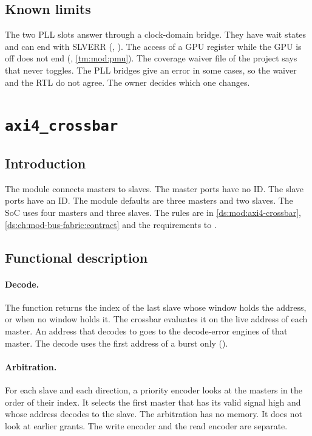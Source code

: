 \subsection{Known limits}
The two PLL slots answer through a clock-domain bridge. They have wait states and can end with SLVERR (, ). The access of a GPU register while the GPU is off does not end (, \cref{tm:mod:pmu}). The coverage waiver file of the project says that  never toggles. The PLL bridges give an error in some cases, so the waiver and the RTL do not agree. The owner decides which one changes.

\section{\texttt{axi4\_crossbar}}\label{tm:mod:axi4-crossbar}

\subsection{Introduction}
The module  connects  masters to  slaves. The master ports have no ID. The slave ports have an ID. The module defaults are three masters and two slaves. The SoC uses four masters and three slaves. The rules are in \cref{ds:mod:axi4-crossbar}, \cref{ds:ch:mod-bus-fabric:contract} and the requirements  to .

\subsection{Functional description}
\paragraph{Decode.} The function  returns the index of the last slave whose window holds the address, or  when no window holds it. The crossbar evaluates it on the live address of each master. An address that decodes to  goes to the decode-error engines of that master. The decode uses the first address of a burst only ().

\paragraph{Arbitration.} For each slave and each direction, a priority encoder looks at the masters in the order of their index. It selects the first master that has its valid signal high and whose address decodes to the slave. The arbitration has no memory. It does not look at earlier grants. The write encoder and the read encoder are separate.


